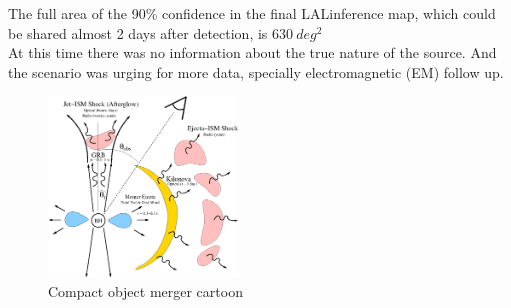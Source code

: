 \documentclass[10pt]{beamer}
\begin{document}
\begin{frame}
The full area of the 90\% confidence in the final LALinference map, 
which could be shared almost 2 days after detection, is $630 \ deg^2$\\
\pause
At this time there was no information about the true nature of the source.
And the scenario was urging for more data, specially electromagnetic (EM)
follow up.\\

\begin{figure}
 \includegraphics[width=0.45\textwidth]{./slides/plots/cartoon.jpg}
 \caption{\scriptsize{Compact object merger cartoon}}
\end{figure}
\end{frame}
\end{document}
